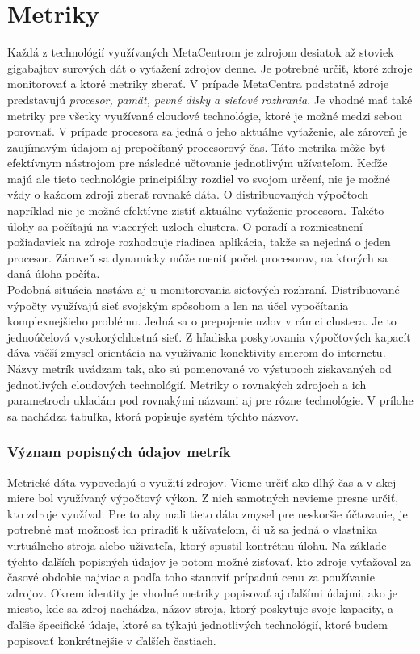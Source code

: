 \documentclass[printed,11pt,twoside,color,cover,table]{fithesis3}
\begin{document}
\chapter{Metriky}
Každá z technológií využívaných MetaCentrom je zdrojom desiatok až stoviek gigabajtov surových dát o vyťažení zdrojov denne. Je potrebné určiť, ktoré zdroje monitorovať a ktoré metriky zberať. V prípade MetaCentra podstatné
zdroje predstavujú \emph{procesor, pamät, pevné disky a sieťové rozhrania}. Je vhodné mať také metriky pre všetky využívané cloudové technológie,
ktoré je možné medzi sebou porovnať. V prípade procesora sa jedná o jeho aktuálne vyťaženie, ale zároveň je zaujímavým údajom aj prepočítaný procesorový čas. Táto metrika môže byť efektívnym
nástrojom pre následné učtovanie jednotlivým užívateľom. Keďže majú ale tieto technológie principiálny rozdiel vo svojom určení, nie je možné vždy o každom zdroji zberať rovnaké dáta. 
O distribuovaných výpočtoch napríklad nie je možné efektívne zistiť aktuálne vyťaženie procesora. Takéto úlohy sa počítajú na viacerých uzloch clustera. O poradí a rozmiestnení požiadaviek na zdroje
rozhodouje riadiaca aplikácia, takže sa nejedná o jeden procesor. Zároveň sa dynamicky môže meniť počet procesorov, na ktorých sa daná úloha počíta.
\\Podobná situácia nastáva aj u monitorovania sieťových rozhraní. Distribuované výpočty využívajú sieť svojským spôsobom a len na účel vypočítania komplexnejšieho problému. Jedná sa o prepojenie
uzlov v rámci clustera. Je to jednoúčelová vysokorýchlostná sieť. Z hľadiska poskytovania výpočtových kapacít dáva väčší zmysel orientácia na využívanie konektivity smerom do internetu. 
\\Názvy metrík uvádzam tak, ako sú pomenované vo výstupoch získavaných od jednotlivých cloudových technológií. Metriky o rovnakých zdrojoch a ich parametroch ukladám pod rovnakými názvami aj pre
rôzne technológie. V prílohe sa nachádza tabuľka, ktorá popisuje systém týchto názvov.

\subsection{Význam popisných údajov metrík}
Metrické dáta vypovedajú o využití zdrojov. Vieme určiť ako dlhý čas a v akej miere bol využívaný výpočtový výkon. Z nich samotných nevieme presne určiť, kto zdroje využíval. Pre to aby mali tieto dáta zmysel 
pre neskoršie účtovanie, je potrebné mať možnosť ich priradiť k užívateľom, či už sa jedná o vlastnika virtuálneho stroja alebo uživateľa, ktorý spustil kontrétnu úlohu. Na základe týchto ďalších popisných  údajov je potom 
možné zisťovať, kto zdroje vyťažoval za časové obdobie najviac a podľa toho stanoviť prípadnú cenu za používanie zdrojov. Okrem identity je vhodné metriky popisovať aj ďalšími údajmi, ako je miesto, kde
sa zdroj nachádza, názov stroja, ktorý poskytuje svoje kapacity, a ďalšie špecifické údaje, ktoré sa týkajú jednotlivých technológií, ktoré budem popisovať konkrétnejšie v ďalších častiach.
\end{document}
